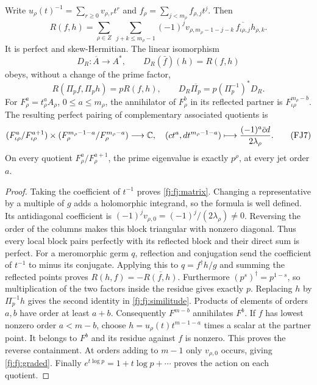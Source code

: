 \begin{theorem}
\label{fj:thm:perfect}
Write $u_\rho(t)^{-1}=\sum_{r\ge0}v_{\rho,r}t^r$ and
$f_\rho=\sum_{j<m_\rho}f_{\rho,j}t^j$. Then
\[
 R(f,h)=\sum_{\rho\in Z}\ \sum_{j+k\le m_\rho-1}
 (-1)^jv_{\rho,m_\rho-1-j-k}\,
 \overline{f_{\iota\rho,j}}h_{\rho,k}.
 \tag{FJ4}\label{fj:fj:matrix}
\]
It is perfect and skew-Hermitian. The linear isomorphism
\[
 D_R:\overline A\longrightarrow A^*,\qquad
 D_R(\bar f)(h)=R(f,h)
 \tag{FJ5}\label{fj:fj:dual}
\]
obeys, without a change of the prime factor,
\[
 R(\Pi_p f,\Pi_p h)=pR(f,h),\qquad
 D_R\overline{\Pi_p}=p(\Pi_p^{-1})^*D_R.
 \tag{FJ6}\label{fj:fj:similitude}
\]
For $F^a_\rho=t_\rho^aA_\rho$, $0\le a\le m_\rho$, the annihilator
of $F^b_\rho$ in its reflected partner is $F^{m_\rho-b}_{\iota\rho}$.
The resulting perfect pairing of complementary associated quotients is
\[
 (F^a_{\iota\rho}/F^{a+1}_{\iota\rho})\times
 (F^{m_\rho-1-a}_\rho/F^{m_\rho-a}_\rho)\longrightarrow\mathbb C,
 \quad (ct^a,dt^{m_\rho-1-a})\longmapsto
       \frac{(-1)^a\bar c d}{2\lambda_\rho}.
 \tag{FJ7}\label{fj:fj:graded}
\]
On every quotient $F^a_\rho/F^{a+1}_\rho$, the prime eigenvalue is
exactly $p^\rho$, at every jet order $a$.
\end{theorem}
\begin{proof}
Taking the coefficient of $t^{-1}$ proves \eqref{fj:fj:matrix}.
Changing a representative by a multiple of $g$ adds a holomorphic
integrand, so the formula is well defined. Its antidiagonal coefficient
is $(-1)^jv_{\rho,0}=(-1)^j/(2\lambda_\rho)\ne0$.
Reversing the order of the columns makes this block triangular with
nonzero diagonal. Thus every local block pairs perfectly with its
reflected block and their direct sum is perfect.
For a meromorphic germ $q$, reflection and conjugation send the
coefficient of $t^{-1}$ to minus its conjugate. Applying this to
$q=f^\dagger h/g$ and summing the reflected points proves
$R(h,f)=-\overline{R(f,h)}$.
Furthermore $(p^s)^\dagger=p^{1-s}$, so multiplication of the two
factors inside the residue gives exactly $p$. Replacing $h$ by
$\Pi_p^{-1}h$ gives the second identity in \eqref{fj:fj:similitude}.
Products of elements of orders $a,b$ have order at least $a+b$.
Consequently $F^{m-b}$ annihilates $F^b$. If $f$ has lowest nonzero
order $a<m-b$, choose $h=u_\rho(t)t^{m-1-a}$ times a scalar at the
partner point. It belongs to $F^b$ and its residue against $f$ is
nonzero. This proves the reverse containment. At orders adding to
$m-1$ only $v_{\rho,0}$ occurs, giving \eqref{fj:fj:graded}.
Finally $e^{t\log p}=1+t\log p+\cdots$ proves the action on each quotient.
\end{proof}

